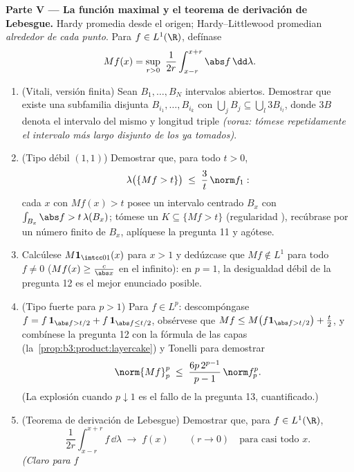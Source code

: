 \begin{problem}
\medskip
\noindent\textbf{Parte V --- La función maximal y el teorema de
derivación de Lebesgue.} Hardy promedia desde el origen;
Hardy--Littlewood promedian \emph{alrededor de cada punto}. Para
$f \in L^1(\R)$, defínase
\[
Mf(x) = \sup_{r>0}\ \frac1{2r}\int_{x-r}^{x+r}\abs
f\,\dd\lambda .
\]
\begin{enumerate}[resume]
  \item (Vitali, versión finita) Sean $B_1, \dots, B_N$ intervalos
  abiertos. Demostrar que existe una subfamilia disjunta
  $B_{i_1}, \dots, B_{i_k}$ con $\bigcup_jB_j
        \subseteq \bigcup_l3B_{i_l}$, donde $3B$ denota el intervalo del
  mismo  y longitud triple
  \emph{(voraz: tómese repetidamente el intervalo más largo disjunto de
  los ya tomados)}. \item (Tipo débil $(1,1)$) Demostrar que, para todo
  $t > 0$,
        \[
        \lambda\bigl(\{Mf > t\}\bigr) \;\leq\;
        \frac3t\,\norm f_1 :
        \]
        cada $x$ con $Mf(x) > t$ posee un intervalo centrado $B_x$ con
        $\int_{B_x}\abs f > t\,\lambda(B_x)$; tómese un
        $K \subseteq \{Mf > t\}$ (regularidad ), recúbrase por
        un número finito de $B_x$, aplíquese la pregunta 11 y agótese.
        \item Calcúlese $M\mathbf 1_{\intcc01}(x)$ para $x > 1$ y
        dedúzcase que $Mf \notin L^1$ para todo $f \neq 0$
        ($Mf(x) \geq \frac c{\abs x}$ en el infinito): en $p =
        1$, la desigualdad débil de la pregunta 12 es el mejor enunciado
        posible. \item (Tipo fuerte para $p > 1$) Para $f \in L^p$:
        descompóngase $f =
        f\,\mathbf 1_{\abs f > t/2} + f\,\mathbf 1_{\abs f
        \leq t/2}$, obsérvese que $Mf \leq M\bigl(f\mathbf 1_{\abs
        f > t/2}\bigr) + \frac t2$, y combínese la pregunta 12 con la
        fórmula de las capas (la~\cref{prop:b3:product:layercake}) y
        Tonelli para demostrar
        \[
        \norm{Mf}_p^p \;\leq\;
        \frac{6p\,2^{p-1}}{p-1}\,\norm f_p^p .
        \]
        (La explosión cuando $p \downarrow 1$ es el fallo de la pregunta
        13, cuantificado.) \item (Teorema de derivación de Lebesgue)
        Demostrar que, para $f \in
        L^1(\R)$,
        \[
        \frac1{2r}\int_{x-r}^{x+r}f\,\dd\lambda
        \;\longrightarrow\; f(x)
        \qquad (r \to 0)\quad\text{para casi todo }x .
        \]
        \emph{(Claro para $f$
}
\end{enumerate}
\end{problem}
